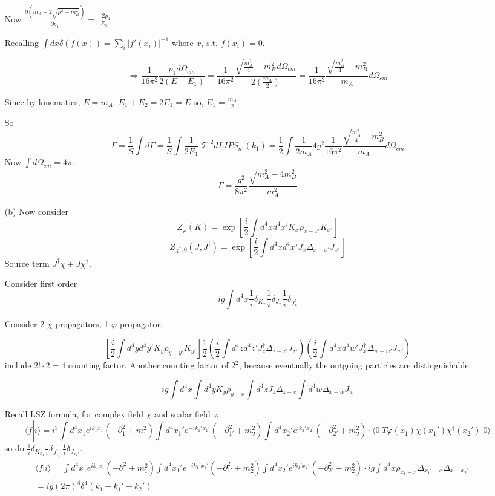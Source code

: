 \documentclass[twoside]{amsart}
\begin{document}
\begin{itemize}
Now $\frac{ \partial ( m_A - 2 \sqrt{ p_1^2 + m_B^2  } ) }{ \partial p_1 } = \frac{-2 p_1 }{ E_1 } $

Recalling $\int dx \delta(f(x) ) = \sum_i | f'(x_i) |^{-1}$ where $x_i$ s.t. $f(x_i) = 0$.  

\[
\Longrightarrow \frac{1}{16 \pi^2 } \frac{ p_1 d\Omega_{cm} }{ 2 (E - E_1) } = \frac{1}{16 \pi^2 } \frac{ \sqrt{ \frac{ m_A^2 }{4 } - m_B^2 } d\Omega_{cm } }{ 2 \left( \frac{m_A}{2} \right) } = \frac{1}{16 \pi^2 } \frac{ \sqrt{ \frac{ m_A^2 }{ 4} - m_B^2 } }{ m_A } d\Omega_{cm}
\]

Since by kinematics, $E = m_A$.  $E_1 + E_2 = 2E_1 = E$ so, $E_1 = \frac{m_A}{2}$.  

So
\[
\Gamma = \frac{1}{S} \int d\Gamma = \frac{1}{S} \int \frac{1}{2 E_1 } | \mathcal{T} |^2 dLIPS_{n'}(k_1) = \frac{1}{2} \int \frac{1}{ 2m_A} 4 g^2 \frac{1}{16 \pi^2 } \frac{ \sqrt{ \frac{ m_A^2 }{ 4 } - m_B^2 } }{ m_A} d\Omega_{cm}
\]
Now $\int d\Omega_{cm} = 4\pi$.  
\[
\boxed{ \Gamma = \frac{ g^2 }{ 8 \pi^2 } \frac{ \sqrt{ m_A^2 - 4 m_B^2 }}{ m_A^2 } }
\]

\item[(b)] Now consider
\[
Z_{\varphi}(K) = \exp{ \left[ \frac{i}{2} \int d^4x d^4x' K_x \rho_{x-x'} K_{x'} \right] }
\]
\[
Z_{\chi^{\dag}, 0}(J,J^{\dag}) = \exp{ \left[ \frac{i}{2} \int d^4x d^4x' J_x^{\dag} \Delta_{x-x'} J_{x'} \right] }
\]
Source term $J^{\dag} \chi + J \chi^{ \dag}$.  

Consider first order
\[
ig \int d^4x \frac{1}{i} \delta_{K_x} \frac{1}{i} \delta_{J_x} \frac{1}{i} \delta_{J_x^{\dag}}
\]

Consider 2 $\chi$ propagators, 1 $\varphi$ propagator.  

\[
\left[ \frac{i}{2} \int d^4y d^4y' K_y \rho_{y-y'} K_{y'} \right] \frac{1}{2} \left( \frac{i}{2} \int d^4z d^4z' J_z^{\dag} \Delta_{z-z'} J_{z'} \right) \left( \frac{i}{2} \int d^4x d^4w' J_x^{\dag} \Delta_{w-w'} J_{w'} \right)
\]
include $2! \cdot 2 = 4$ counting factor.  Another counting factor of $2^2$, because eventually the outgoing particles are distinguishable.  

\[
ig \int d^4x \int d^4y K_y \rho_{y - x} \int d^4z J_z^{\dag} \Delta_{z-x} \int d^4w \Delta_{x-w} J_w
\]

Recall LSZ formula, for complex field $\chi$ and scalar field $\varphi$.  
\[
\langle f | i \rangle = i^3 \int d^4x_1 e^{ik_1 x_1} (- \partial_1^2 + m_1^2 ) \int d^4x_1' e^{-ik_1' x_1' } ( - \partial_{1'}^2 + m_2^2 ) \int d^4x_2' e^{ i k_2' x_2' } ( - \partial_{2'}^2 + m_2^2  ) \cdot \langle 0 | T \varphi(x_1) \chi(x_1') \chi^{\dag}(x_2') | 0 \rangle 
\]
so do $\frac{1}{i} \delta_{K_{x_1}} \frac{1}{i} \delta_{J^{\dag}_{x_1'}} \frac{1}{i} \delta_{J_{x_2'} }$.  
\[
\begin{gathered}
  \langle f | i \rangle = \int d^4x_1 e^{ik_1 x_1 }( - \partial_1^2 + m_1^2 ) \int d^4x_1' e^{-ik_1' x_1' } ( - \partial_{1'}^2 + m_2^2 ) \int d^4x_2' e^{ik_2' x_2'} ( - \partial_{2'}^2 + m_2^2 ) \cdot ig \int d^4x \rho_{x_1-  x} \Delta_{x_1' - x} \Delta_{x-x_2'} = \\ 
  = ig (2\pi)^4 \delta^4(k_1 - k_1' + k_2')
\end{gathered}
\]


\end{itemize}
\end{document}
